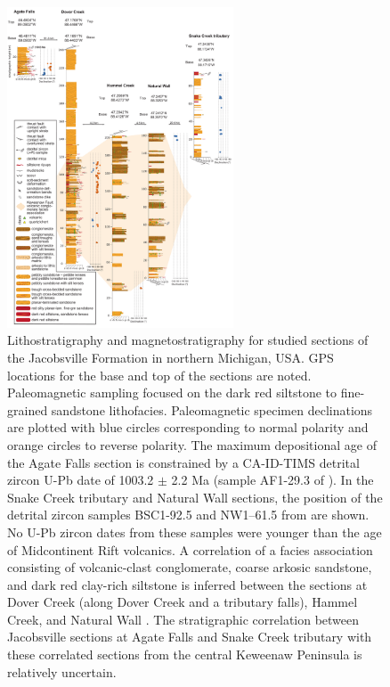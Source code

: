 \begin{figure}[h!]
\centering
\includegraphics[width=0.6\textwidth]{figure/Zhang2024a/Jacobsville_Sections_v6.pdf}
\caption[Lithostratigraphy and magnetostratigraphy for studied sections of the Jacobsville Formation]{\footnotesize Lithostratigraphy and magnetostratigraphy for studied sections of the Jacobsville Formation in northern Michigan, USA. GPS locations for the base and top of the sections are noted. Paleomagnetic sampling focused on the dark red siltstone to fine-grained sandstone lithofacies. Paleomagnetic specimen declinations are plotted with blue circles corresponding to normal polarity and orange circles to reverse polarity. The maximum depositional age of the Agate Falls section is constrained by a CA-ID-TIMS detrital zircon U-Pb date of 1003.2 $\pm$ 2.2 Ma (sample AF1-29.3 of \cite{Hodgin2022a}). In the Snake Creek tributary and Natural Wall sections, the position of the detrital zircon samples BSC1-92.5 and NW1–61.5 from \cite{Hodgin2022a} are shown. No U-Pb zircon dates from these samples were younger than the age of Midcontinent Rift volcanics. A correlation of a facies association consisting of volcanic-clast conglomerate, coarse arkosic sandstone, and dark red clay-rich siltstone is inferred between the sections at Dover Creek (along Dover Creek and a tributary falls), Hammel Creek, and Natural Wall \citep{Brojanigo1984a}. The stratigraphic correlation between Jacobsville sections at Agate Falls and Snake Creek tributary with these correlated sections from the central Keweenaw Peninsula is relatively uncertain.}
\label{fig:strat_column}
\end{figure}

